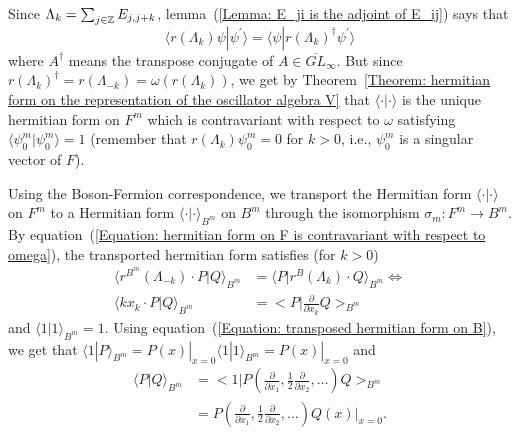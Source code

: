 Since $\Lambda_k=\sum_{j\in\mathbb{Z}}E_{j,j+k}$, lemma~(\ref{Lemma: E_ji is the adjoint of E_ij}) says that
\begin{equation}\label{Equation: hermitian form on F is contravariant with respect to omega}
     \langle r(\Lambda_k)\psi|\psi^\prime \rangle=\langle \psi|r(\Lambda_k)^\dagger\psi^\prime \rangle
\end{equation}
where $A^\dagger$ means the transpose conjugate of $A\in \overline{GL}_\infty$. But since $r(\Lambda_k)^\dagger =r(\Lambda_{-k})=\omega(r(\Lambda_{k}))$, we get by Theorem~\ref{Theorem: hermitian form on the representation of the oscillator algebra V} that $\langle\cdot|\cdot\rangle$ is the unique hermitian form on $F^m$ which is contravariant with respect to $\omega$ satisfying $\langle \psi_0^m|\psi_0^m\rangle=1$ (remember that $r(\Lambda_k)\psi_0^m=0$ for $k>0$, i.e., $\psi_0^m$ is a singular vector of $F$).\par
Using the Boson-Fermion correspondence, we transport the Hermitian form $\langle\cdot|\cdot\rangle$ on $F^m$ to a Hermitian form $\langle\cdot|\cdot\rangle_{B^m}$ on $B^m$ through the isomorphism $\sigma_m: F^m\rightarrow B^m$. By equation~(\ref{Equation: hermitian form on F is contravariant with respect to omega}), the transported hermitian form satisfies (for $k>0$)
\begin{equation}\label{Equation: transposed hermitian form on B}
\begin{split}
     \langle r^{B^m}(\Lambda_{-k})\cdot P|Q\rangle_{B^m}&=\langle P|r^B(\Lambda_k)\cdot Q\rangle_{B^m}\iff \\
          \langle kx_k\cdot P|Q\rangle_{B^m}&=\biggl< P\bigg|\frac{\partial}{\partial x_k} Q\biggr>_{B^m}
\end{split}
\end{equation}
and $\langle1|1\rangle_{B^m}=1$. Using equation~(\ref{Equation: transposed hermitian form on B}), we get that $ \langle 1|P\rangle_{B^m}=P(x)|_{x=0}\langle 1|1\rangle_{B^m}=P(x)|_{x=0}$ and
\begin{equation}\label{Equation: transposed hermitian form to B}
\begin{split}
     \langle P|Q\rangle_{B^m}&=\biggl< 1\bigg| P\left(\frac{\partial}{\partial x_1},\frac{1}{2}\frac{\partial}{\partial x_2},\dots\right)Q\biggr>_{B^m}\\
     &= P\left(\frac{\partial}{\partial x_1},\frac{1}{2}\frac{\partial}{\partial x_2},\dots\right)Q(x)\bigg|_{x=0}.
\end{split}
\end{equation}
